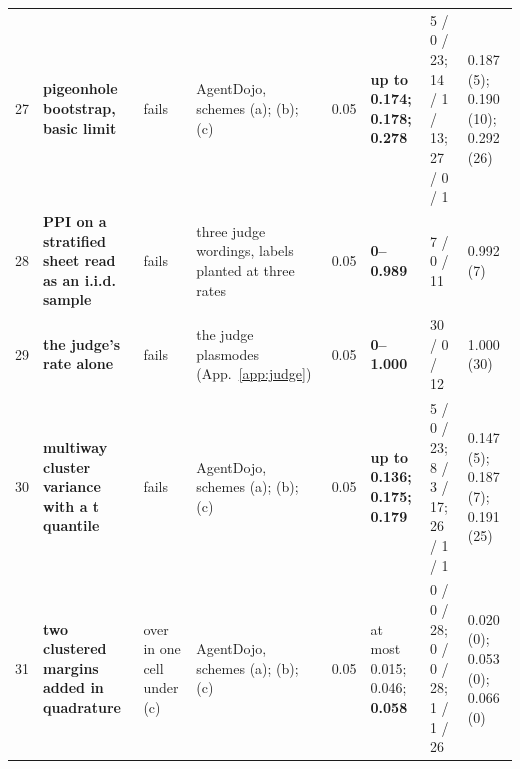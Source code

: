 \begin{tabular}{@{}r p{2.8cm} p{2.0cm} p{3.9cm} l p{2.1cm} p{2.0cm} p{1.9cm}@{}}
27 & \textbf{pigeonhole bootstrap, basic limit} & fails & AgentDojo, schemes (a); (b); (c) & 0.05 & \textbf{up to 0.174; 0.178; 0.278} & 5 / 0 / 23; 14 / 1 / 13; 27 / 0 / 1 & 0.187 (5); 0.190 (10); 0.292 (26) \\
28 & \textbf{PPI on a stratified sheet read as an i.i.d. sample} & fails & three judge wordings, labels planted at three rates & 0.05 & \textbf{0--0.989} & 7 / 0 / 11 & 0.992 (7) \\
29 & \textbf{the judge's rate alone} & fails & the judge plasmodes (App.~\ref{app:judge}) & 0.05 & \textbf{0--1.000} & 30 / 0 / 12 & 1.000 (30) \\
30 & \textbf{multiway cluster variance with a t quantile} & fails & AgentDojo, schemes (a); (b); (c) & 0.05 & \textbf{up to 0.136; 0.175; 0.179} & 5 / 0 / 23; 8 / 3 / 17; 26 / 1 / 1 & 0.147 (5); 0.187 (7); 0.191 (25) \\
31 & \textbf{two clustered margins added in quadrature} & over in one cell under (c) & AgentDojo, schemes (a); (b); (c) & 0.05 & at most 0.015; 0.046; \textbf{0.058} & 0 / 0 / 28; 0 / 0 / 28; 1 / 1 / 26 & 0.020 (0); 0.053 (0); 0.066 (0) \\
\bottomrule
\end{tabular}
